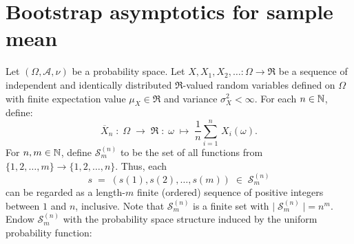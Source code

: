 

\section{Bootstrap asymptotics for sample mean}
\setcounter{theorem}{0}
\setcounter{equation}{0}

\newcommand{\Snm}{\mathcal{S}^{(n)}_{m}}
\newcommand{\Xnm}{\overline{X}^{(n)}_{m}}

\begin{theorem}
\mbox{}\vskip 0.1cm
\noindent
Let $\left(\Omega,\mathcal{A},\nu\right)$ be a probability space.
Let $X, X_{1}, X_{2}, \ldots : \Omega \longrightarrow \Re$ be a sequence
of independent and identically distributed $\Re$-valued random variables
defined on $\Omega$
{\color{red}with finite expectation value $\mu_{X} \in \Re$ and variance $\sigma^{2}_{X} < \infty$}.
For each $n \in \mathbb{N}$, define:
\begin{equation*}
\overline{X}_{n} \;:\; \Omega \; \longrightarrow \; \Re \;:\; \omega \; \longmapsto \; \dfrac{1}{n}\sum^{n}_{i=1}\,X_{i}(\omega).
\end{equation*}
For $n, m \in \mathbb{N}$, define $\Snm$ to be the set of all functions from $\{1,2,\ldots,m\} \longrightarrow \{1,2,\ldots,n\}$.
Thus, each
\begin{equation*}
s \; = \; \left(s(1), s(2), \ldots, s(m) \right) \;\in\; \Snm
\end{equation*}
can be regarded as a length-$m$ finite (ordered) sequence of positive integers between $1$ and $n$, inclusive.
Note that $\Snm$ is a finite set with $\vert\;\Snm\;\vert = n^{m}$.
Endow $\Snm$ with the probability space structure induced by the uniform probability function:
\begin{equation*}

\end{equation*}
\end{theorem}
